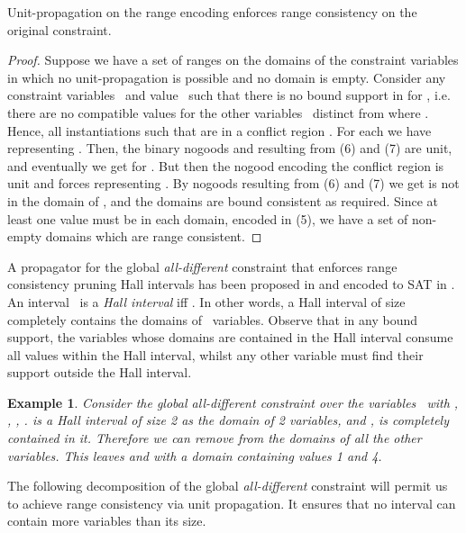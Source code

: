 \documentclass{tlp}
\newtheorem{example}{Example}
\begin{document}
\begin{theorem} \label{thm:rng}
Unit-propagation on the range encoding enforces range consistency on the original constraint.
\end{theorem}
\begin{proof}
Suppose we have a set of ranges on the domains of the constraint variables in which no unit-propagation is possible and no domain is empty.
Consider any constraint variables~ and value~ such that there is no bound support in  for , i.e. there are no compatible values for the other variables~ distinct from  where . Hence, all instantiations such that  are in a conflict region . For each  we have  representing . Then, the binary nogoods  and  resulting from (6) and (7) are unit, and eventually we get  for . But then the nogood  encoding the conflict region is unit and forces  representing . By nogoods resulting from (6) and (7) we get  is not in the domain of , and the domains are bound consistent as required.
Since at least one value must be in each domain, encoded in (5), we have a set of non-empty domains which are range consistent.
\end{proof}
A propagator for the global \emph{all-different} constraint that enforces range consistency pruning Hall intervals has been proposed in  and encoded to SAT in .
An interval~ is a \emph{Hall interval} iff . In other words, a Hall interval of size~ completely contains the domains of ~variables. Observe that in any bound support, the variables whose domains are contained in the Hall interval consume all values within the Hall interval, whilst any other variable must find their support outside the Hall interval.
\begin{example}
Consider the global \emph{all-different} constraint over the variables~ with , , , .  is a Hall interval of size 2 as the domain of 2 variables,  and , is completely contained in it. Therefore we can remove  from the domains of all the other variables. This leaves  and  with a domain containing values 1 and 4.
\end{example}
The following decomposition of the global \emph{all-different} constraint will permit us to achieve range consistency via unit propagation. It ensures that no interval  can contain more variables than its size. 
\end{document}
